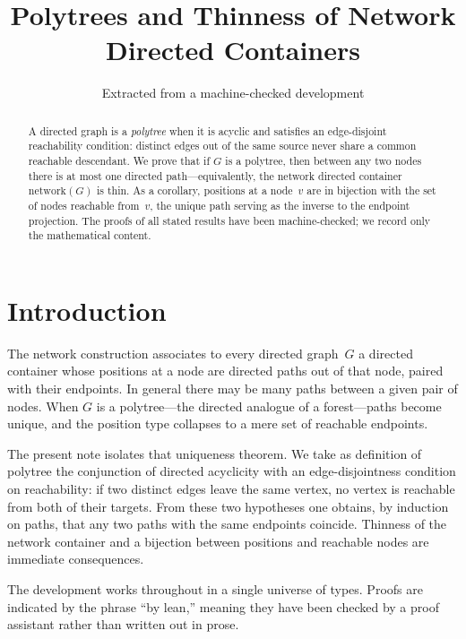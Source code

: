 \documentclass[11pt,a4paper]{article}
\title{Polytrees and Thinness of Network Directed Containers}
\author{Extracted from a machine-checked development}
\date{}
\theoremstyle{plain}
\theoremstyle{definition}
\begin{document}
\maketitle

\begin{abstract}
A directed graph is a \emph{polytree} when it is acyclic and satisfies an
edge-disjoint reachability condition: distinct edges out of the same source
never share a common reachable descendant. We prove that if $G$ is a polytree,
then between any two nodes there is at most one directed path---equivalently,
the network directed container $\mathrm{network}(G)$ is thin. As a corollary,
positions at a node~$v$ are in bijection with the set of nodes reachable
from~$v$, the unique path serving as the inverse to the endpoint projection.
The proofs of all stated results have been machine-checked; we record only the
mathematical content.
\end{abstract}

\tableofcontents
\bigskip

\section{Introduction}

The network construction associates to every directed graph~$G$ a directed
container whose positions at a node are directed paths out of that node,
paired with their endpoints. In general there may be many paths between a
given pair of nodes. When $G$ is a polytree---the directed analogue of a
forest---paths become unique, and the position type collapses to a mere set of
reachable endpoints.

The present note isolates that uniqueness theorem. We take as definition of
polytree the conjunction of directed acyclicity with an edge-disjointness
condition on reachability: if two distinct edges leave the same vertex, no
vertex is reachable from both of their targets. From these two hypotheses one
obtains, by induction on paths, that any two paths with the same endpoints
coincide. Thinness of the network container and a bijection between positions
and reachable nodes are immediate consequences.

The development works throughout in a single universe of types. Proofs are
indicated by the phrase ``by lean,'' meaning they have been checked by a proof
assistant rather than written out in prose.
\end{document}
